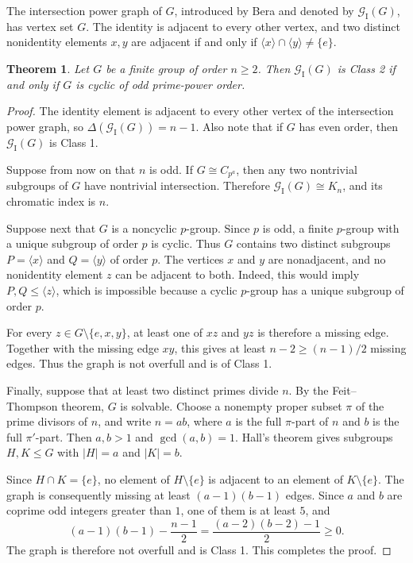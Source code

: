 \documentclass{article}
\newtheorem{theorem}{Theorem}[section]
\theoremstyle{definition}
\theoremstyle{indentclaim}
\theoremstyle{named}
\theoremstyle{named}
\begin{document}
\bigskip

The intersection power graph of $G$, introduced by Bera \cite{Bera2018} and
denoted by $\mathscr{G}_{\mathrm{I}}(G)$, has vertex set $G$. The identity is
adjacent to every other vertex, and two distinct nonidentity elements $x,y$
are adjacent if and only if
$\langle x\rangle\cap\langle y\rangle\neq\{e\}$.

\begin{theorem}
\label{thm:intersection-power}
Let $G$ be a finite group of order $n\geq 2$. Then
$\mathscr{G}_{\mathrm{I}}(G)$ is Class 2 if and only if  $G$ is cyclic of odd prime-power order. 
\end{theorem}

\begin{proof}
The identity element is adjacent to every other vertex of the
intersection power graph, so
$\Delta(\mathscr{G}_{\mathrm{I}}(G))=n-1$. Also note that if $G$ has even order, then $\mathscr{G}_{\mathrm{I}}(G)$ is Class 1. 

Suppose from now on that $n$ is
odd. If $G\cong C_{p^a}$, then any two nontrivial subgroups of $G$ have
nontrivial intersection. Therefore
$\mathscr{G}_{\mathrm{I}}(G)\cong K_n$, and its chromatic index is $n$.

Suppose next that $G$ is a noncyclic $p$-group. Since $p$ is odd, a finite
$p$-group with a unique subgroup of order $p$ is cyclic. Thus $G$ contains
two distinct subgroups $P=\langle x\rangle$ and $Q=\langle y\rangle$ of
order $p$. The vertices $x$ and $y$ are nonadjacent, and no nonidentity
element $z$ can be adjacent to both. Indeed, this would imply
$P,Q\leq\langle z\rangle$, which is impossible because a cyclic $p$-group
has a unique subgroup of order $p$.

For every $z\in G\setminus\{e,x,y\}$, at least one of $xz$ and $yz$ is
therefore a missing edge. Together with the missing edge $xy$, this gives at
least $n-2\geq(n-1)/2$ missing edges. Thus the graph is not overfull and is
of Class 1.

Finally, suppose that at least two distinct primes divide $n$. By the
Feit--Thompson theorem, $G$ is solvable. Choose a
nonempty proper subset $\pi$ of the prime divisors of $n$, and write $n=ab$,
where $a$ is the full $\pi$-part of $n$ and $b$ is the full $\pi'$-part.
Then $a,b>1$ and $\gcd(a,b)=1$. Hall's theorem gives
subgroups $H,K\leq G$ with $|H|=a$ and $|K|=b$.

Since $H\cap K=\{e\}$, no element of $H\setminus\{e\}$ is adjacent to an
element of $K\setminus\{e\}$. The graph is consequently missing at least
$(a-1)(b-1)$ edges. Since $a$ and $b$ are coprime odd integers greater than
$1$, one of them is at least $5$, and
\[
 (a-1)(b-1)-\frac{n-1}{2}
   =\frac{(a-2)(b-2)-1}{2}\geq 0.
\]
The graph is therefore not overfull and is Class 1. This completes the proof. 
\end{proof}
\end{document}
